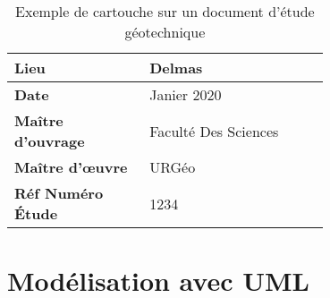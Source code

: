 \par    
\begin{table}
        \centering
        \begin{tabular}{|p{0.30\linewidth}|p{0.40\linewidth}|}
                \hline
                \textbf{Lieu} & Delmas \\
                \hline
                \textbf{Date} & Janier 2020 \\
                \hline
                \textbf{Maître d'ouvrage} & Faculté Des Sciences \\
                \hline
                \textbf{Maître d'œuvre} & URGéo \\
                \hline
                \textbf{Réf Numéro Étude} & 1234 \\
                \hline
        \end{tabular}
        \caption{Exemple de cartouche sur un document d'étude géotechnique} \label{tab:example_cartouche}
\end{table}
\par

        \section{Modélisation avec UML}
                \lipsum[1]
